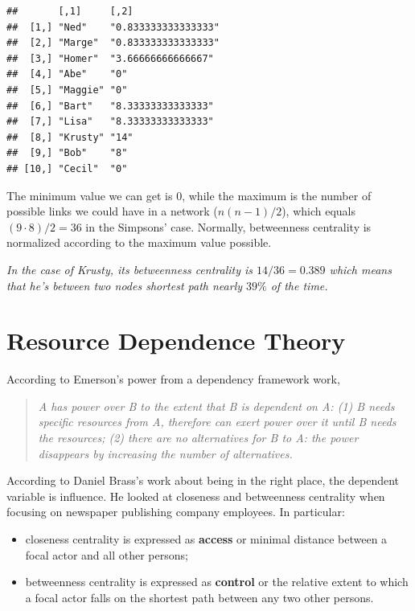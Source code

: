 \documentclass[
  notitlepage,
  onecolumn,
  openany]{book}
\begin{document}
\begin{verbatim}
##       [,1]     [,2]               
##  [1,] "Ned"    "0.833333333333333"
##  [2,] "Marge"  "0.833333333333333"
##  [3,] "Homer"  "3.66666666666667" 
##  [4,] "Abe"    "0"                
##  [5,] "Maggie" "0"                
##  [6,] "Bart"   "8.33333333333333" 
##  [7,] "Lisa"   "8.33333333333333" 
##  [8,] "Krusty" "14"               
##  [9,] "Bob"    "8"                
## [10,] "Cecil"  "0"
\end{verbatim}

The minimum value we can get is 0, while the maximum is the number of possible links we could have in a network (\(n(n-1)/2\)), which equals \((9\cdot 8)/2 = 36\) in the Simpsons' case. Normally, betweenness centrality is normalized according to the maximum value possible.

\emph{In the case of Krusty, its betweenness centrality is \(14/36 = 0.389\) which means that he's between two nodes shortest path nearly \(39\%\) of the time.}

\hypertarget{resource-dependence-theory}{%
\section{Resource Dependence Theory}\label{resource-dependence-theory}}

According to Emerson's power from a dependency framework work,

\begin{quote}
\emph{A has power over B to the extent that B is dependent on A:
(1) B needs specific resources from A, therefore can exert power over it until B needs the resources;
(2) there are no alternatives for B to A: the power disappears by increasing the number of alternatives.}
\end{quote}

According to Daniel Brass's work about being in the right place, the dependent variable is influence. He looked at closeness and betweenness centrality when focusing on newspaper publishing company employees. In particular:

\begin{itemize}
\item
  closeness centrality is expressed as \textbf{access} or minimal distance between a focal actor and all other persons;
\item
  betweenness centrality is expressed as \textbf{control} or the relative extent to which a focal actor falls on the shortest path between any two other persons.
\end{itemize}
\end{document}
